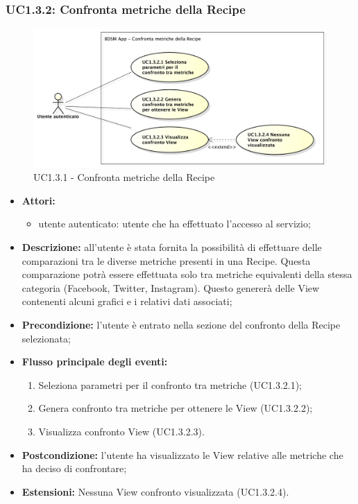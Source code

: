 \subsubsection{UC1.3.2: Confronta metriche della Recipe}
\begin{figure}[!htbp]
	\centering
	\centerline{\includegraphics[scale=0.45]{./images/UC1_3_2.pdf}}
	\caption{UC1.3.1 - Confronta metriche della Recipe}
\end{figure}

\begin{itemize}
	\item \textbf{Attori:}
	\begin{itemize}
		\item utente autenticato: utente che ha effettuato l'accesso al servizio;
	\end{itemize}
	\item \textbf{Descrizione:} all'utente è stata fornita la possibilità di effettuare delle comparazioni tra le diverse metriche presenti in una Recipe. Questa comparazione potrà essere effettuata solo tra metriche equivalenti della stessa categoria (Facebook, Twitter, Instagram). Questo genererà delle View contenenti alcuni grafici e i relativi dati associati;
	\item \textbf{Precondizione:} l'utente è entrato nella sezione del confronto della Recipe selezionata;
	\item \textbf{Flusso principale degli eventi:}
		\begin{enumerate}
			\item Seleziona parametri per il confronto tra metriche (UC1.3.2.1);
			\item Genera confronto tra metriche per ottenere le View (UC1.3.2.2);
			\item Visualizza confronto View (UC1.3.2.3).
		\end{enumerate}
	\item \textbf{Postcondizione:} l'utente ha visualizzato le View relative alle metriche che ha deciso di confrontare;
	\item \textbf{Estensioni:} Nessuna View confronto visualizzata (UC1.3.2.4).

\end{itemize}

